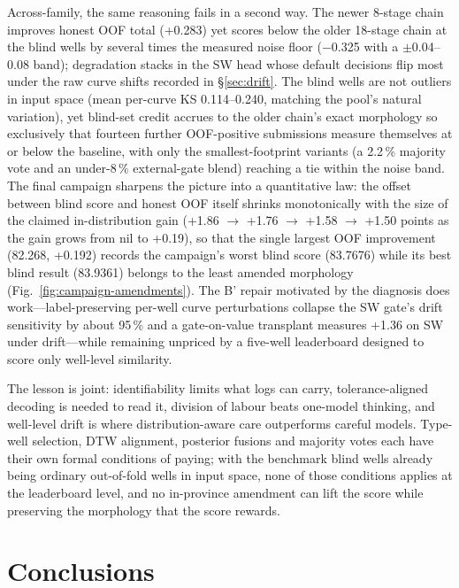 \documentclass[preprint,12pt]{elsarticle}
\begin{document}
Across-family, the same reasoning fails in a second way. The newer 8-stage chain improves honest OOF total (+0.283) yet scores below the older 18-stage chain at the blind wells by several times the measured noise floor ($-$0.325 with a $\pm$0.04--0.08 band); degradation stacks in the SW head whose default decisions flip most under the raw curve shifts recorded in \S\ref{sec:drift}. The blind wells are not outliers in input space (mean per-curve KS 0.114--0.240, matching the pool's natural variation), yet blind-set credit accrues to the older chain's exact morphology so exclusively that fourteen further OOF-positive submissions measure themselves at or below the baseline, with only the smallest-footprint variants (a 2.2\,\% majority vote and an under-8\,\% external-gate blend) reaching a tie within the noise band. The final campaign sharpens the picture into a quantitative law: the offset between blind score and honest OOF itself shrinks monotonically with the size of the claimed in-distribution gain (+1.86 $\to$ +1.76 $\to$ +1.58 $\to$ +1.50 points as the gain grows from nil to +0.19), so that the single largest OOF improvement (82.268, +0.192) records the campaign's worst blind score (83.7676) while its best blind result (83.9361) belongs to the least amended morphology (Fig.~\ref{fig:campaign-amendments}). The B' repair motivated by the diagnosis does work---label-preserving per-well curve perturbations collapse the SW gate's drift sensitivity by about 95\,\% and a gate-on-value transplant measures +1.36 on SW under drift---while remaining unpriced by a five-well leaderboard designed to score only well-level similarity.

The lesson is joint: identifiability limits what logs can carry, tolerance-aligned decoding is needed to read it, division of labour beats one-model thinking, and well-level drift is where distribution-aware care outperforms careful models. Type-well selection, DTW alignment, posterior fusions and majority votes each have their own formal conditions of paying; with the benchmark blind wells already being ordinary out-of-fold wells in input space, none of those conditions applies at the leaderboard level, and no in-province amendment can lift the score while preserving the morphology that the score rewards.

\section{Conclusions}
\end{document}
